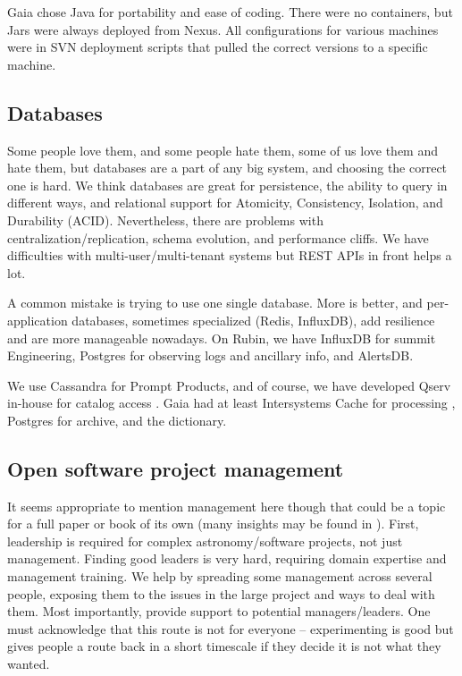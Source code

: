 \documentclass[11pt,twoside]{article}
\begin{document}
Gaia chose Java for portability and ease of coding.
There were no containers, but Jars were always deployed from Nexus.
All configurations for various machines were in SVN deployment scripts that pulled the correct versions to a specific machine.

\subsection{Databases}
Some people love them, and some people hate them, some of us love them and hate them, but databases are a part of any big system, and choosing the correct one is hard.
We think databases are great for persistence, the ability to query in different ways, and relational support for Atomicity, Consistency, Isolation, and Durability (ACID).
Nevertheless, there are problems with centralization/replication, schema evolution, and performance cliffs.
We have difficulties with multi-user/multi-tenant systems but
REST APIs in front helps a lot.

A common mistake is trying to use one single database.
More is better, and per-application databases, sometimes specialized (Redis, InfluxDB), add resilience and are more manageable nowadays.
On Rubin, we have InfluxDB for summit Engineering, Postgres for observing logs and ancillary info, and AlertsDB.

We use Cassandra for Prompt Products, and of course, we have developed Qserv in-house for catalog access \citep{C15_adassxxxii}.
Gaia had at least Intersystems Cache for processing \citep{2011ExA....31..215O}, Postgres for archive, and the dictionary.

\subsection{Open software project management}
It seems appropriate to mention management here though that could be a topic for a full paper or book of its own
(many insights may be found in \citet{OMULLANE2005}).
First, leadership is required for complex astronomy/software projects, not just management.
Finding good leaders is very hard, requiring domain expertise and management training.
We help by spreading some management across several people, exposing them to the issues in the large project and ways to deal with them.
Most importantly, provide support to potential managers/leaders.
One must acknowledge that this route is not for everyone -- experimenting is good but gives people a route back in a short timescale if they decide it is not what they wanted.
\end{document}
